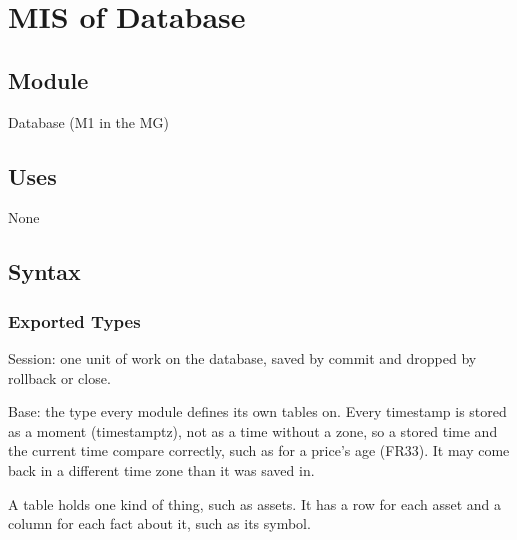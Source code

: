\documentclass[12pt, titlepage]{article}
\begin{document}
\newpage

\section{MIS of Database} \label{MisDB}

\subsection{Module}

Database (M1 in the MG)

\subsection{Uses}

None

\subsection{Syntax}

\subsubsection{Exported Types}

\noindent Session: one unit of work on the database, saved by commit and
dropped by rollback or close.

\medskip

\noindent Base: the type every module defines its own tables on. Every
timestamp is stored as a moment (timestamptz), not as a time without a zone,
so a stored time and the current time compare correctly, such as for a
price's age (FR33). It may come back in a different time zone than it was
saved in.

\medskip
\noindent A table holds one kind of thing, such as assets. It has a row for
each asset and a column for each fact about it, such as its symbol.
\end{document}
